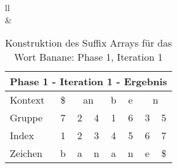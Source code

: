 \begin{table}[H]
\begin{adjustbox}{max width=\textwidth}
\begin{tabular}{ll}
\\
&
\\

\begin{tabular}{lccccccc}
\multicolumn{8}{l}{Phase 1 - Iteration 1 - Ergebnis}                                                                                                                                                          \\ \hline
\multicolumn{1}{l|}{Kontext} & \multicolumn{1}{c|}{\$} & \multicolumn{2}{c|}{\cellcolor[HTML]{\yellow}an}                            & \multicolumn{1}{c|}{b} & \multicolumn{1}{c|}{e} & \multicolumn{2}{c}{n} \\
\multicolumn{1}{l|}{Gruppe}  & \multicolumn{1}{c|}{7}  & \cellcolor[HTML]{\yellow}2 & \multicolumn{1}{c|}{\cellcolor[HTML]{\yellow}4} & \multicolumn{1}{c|}{1} & \multicolumn{1}{c|}{6} & 3         & 5         \\ \hline
\multicolumn{1}{l|}{Index}   & 1                       & 2                         & 3                                              & 4                      & 5                      & 6         & 7         \\
\multicolumn{1}{l|}{Zeichen} & b                       & a                         & n                                              & a                      & n                      & e         & \$       
\end{tabular}

\end{tabular}
\end{adjustbox}

\caption[Konstruktion des Suffix Arrays f{\"u}r das Wort Banane: Phase 1, Iteration 1]{Konstruktion des Suffix Arrays f{\"u}r das Wort Banane: Phase 1, Iteration 1}
\label{fig_banane_1_1} 
\end{table}
